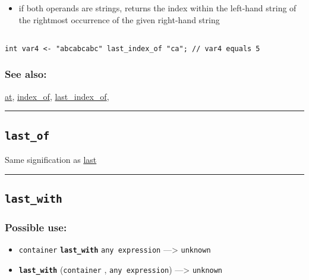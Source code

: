 \documentclass[]{book}
\providecommand{\tightlist}{%
  \setlength{\itemsep}{0pt}\setlength{\parskip}{0pt}}
\theoremstyle{definition}
\theoremstyle{definition}
\theoremstyle{definition}
\theoremstyle{remark}
\begin{document}
\begin{itemize}
\tightlist
\item
  if both operands are strings, returns the index within the left-hand
  string of the rightmost occurrence of the given right-hand string
\end{itemize}

\begin{verbatim}
 
int var4 <- "abcabcabc" last_index_of "ca"; // var4 equals 5
\end{verbatim}

\subsubsection{See also:}\label{see-also-123}

\href{OperatorsAA\#at}{at}, \href{OperatorsIM\#index_of}{index\_of},
\href{OperatorsIM\#last_index_of}{last\_index\_of},

\begin{center}\rule{0.5\linewidth}{\linethickness}\end{center}

\subsection{\texorpdfstring{\texttt{last\_of}}{last\_of}}\label{last_of}

Same signification as \href{OperatorsIM\#last}{last}

\begin{center}\rule{0.5\linewidth}{\linethickness}\end{center}

\subsection{\texorpdfstring{\texttt{last\_with}}{last\_with}}\label{last_with}

\subsubsection{Possible use:}\label{possible-use-318}

\begin{itemize}
\tightlist
\item
  \texttt{container} \textbf{\texttt{last\_with}}
  \texttt{any\ expression} ---\textgreater{} \texttt{unknown}
\item
  \textbf{\texttt{last\_with}} (\texttt{container} ,
  \texttt{any\ expression}) ---\textgreater{} \texttt{unknown}
\end{itemize}
\end{document}
